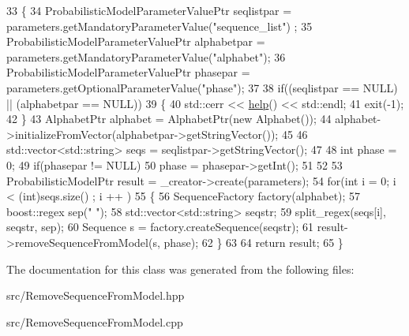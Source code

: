 \begin{DoxyCode}
33   \{
34     ProbabilisticModelParameterValuePtr seqlistpar = parameters.getMandatoryParameterValue(\textcolor{stringliteral}{"sequence\_list"})
      ;
35     ProbabilisticModelParameterValuePtr alphabetpar = parameters.getMandatoryParameterValue(\textcolor{stringliteral}{"alphabet"});
36     ProbabilisticModelParameterValuePtr phasepar = parameters.getOptionalParameterValue(\textcolor{stringliteral}{"phase"});
37 
38     \textcolor{keywordflow}{if}((seqlistpar == NULL) || (alphabetpar == NULL))
39       \{
40         std::cerr << \hyperlink{classtops_1_1RemoveSequenceFromModel_a0b147b31e334ab5a784e4771178bea58}{help}() << std::endl;
41         exit(-1);
42       \}
43     AlphabetPtr alphabet = AlphabetPtr(\textcolor{keyword}{new} Alphabet());
44     alphabet->initializeFromVector(alphabetpar->getStringVector());
45 
46     std::vector<std::string> seqs = seqlistpar->getStringVector();
47 
48     \textcolor{keywordtype}{int} phase = 0;
49     \textcolor{keywordflow}{if}(phasepar != NULL)
50       phase = phasepar->getInt();
51 
52 
53     ProbabilisticModelPtr result = \_creator->create(parameters);
54     \textcolor{keywordflow}{for}(\textcolor{keywordtype}{int} i = 0; i < (int)seqs.size() ; i ++ )
55       \{
56         SequenceFactory factory(alphabet);
57         boost::regex sep(\textcolor{stringliteral}{" "});
58         std::vector<std::string> seqstr;
59         split\_regex(seqs[i], seqstr,  sep);
60         Sequence s = factory.createSequence(seqstr);
61         result->removeSequenceFromModel(s, phase);
62       \}
63 
64     \textcolor{keywordflow}{return} result;
65   \}
\end{DoxyCode}


The documentation for this class was generated from the following files\+:\begin{DoxyCompactItemize}
\item 
src/Remove\+Sequence\+From\+Model.\+hpp\item 
src/Remove\+Sequence\+From\+Model.\+cpp\end{DoxyCompactItemize}
